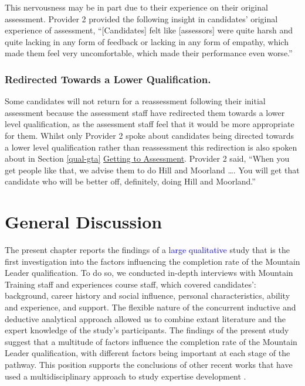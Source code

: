 \documentclass[
  12pt,
  a4paper,
]{book}
\begin{document}
This nervousness may be in part due to their experience on their original assessment. Provider 2 provided the following insight in candidates' original experience of assessment, ``{[}Candidates{]} felt like {[}assessors{]} were quite harsh and quite lacking in any form of feedback or lacking in any form of empathy, which made them feel very uncomfortable, which made their performance even worse.''

\hypertarget{redirected-towards-a-lower-qualification.}{%
\subsubsection{Redirected Towards a Lower Qualification.}\label{redirected-towards-a-lower-qualification.}}

Some candidates will not return for a reassessment following their initial assessment because the assessment staff have redirected them towards a lower level qualification, as the assessment staff feel that it would be more appropriate for them. Whilst only Provider 2 spoke about candidates being directed towards a lower level qualification rather than reassessment this redirection is also spoken about in Section \ref{qual-gta} \protect\hyperlink{qual-gta}{Getting to Assessment}. Provider 2 said, ``When you get people like that, we advise them to do Hill and Moorland \ldots. You will get that candidate who will be better off, definitely, doing Hill and Moorland.''

\hypertarget{qual-general-discussion}{%
\section{General Discussion}\label{qual-general-discussion}}

The present chapter reports the findings of a \textcolor{blue}{large qualitative} study that is the first investigation into the factors influencing the completion rate of the Mountain Leader qualification. To do so, we conducted in-depth interviews with Mountain Training staff and experiences course staff, which covered candidates': background, career history and social influence, personal characteristics, ability and experience, and support. The flexible nature of the concurrent inductive and deductive analytical approach allowed us to combine extant literature and the expert knowledge of the study's participants. The findings of the present study suggest that a multitude of factors influence the completion rate of the Mountain Leader qualification, with different factors being important at each stage of the pathway. This position supports the conclusions of other recent works that have used a multidisciplinary approach to study expertise development \citep[e.g.,][]{Hardy2017, Gullich2019, Jones2020}.
\end{document}
